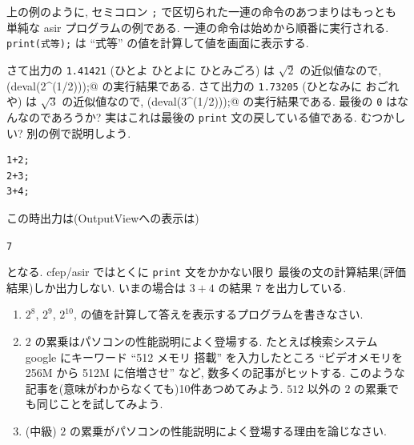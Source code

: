 \documentclass{jbook}
\begin{document}
上の例のように,
セミコロン {\tt ;} で区切られた一連の命令のあつまりはもっとも
単純な asir プログラムの例である.  
一連の命令は始めから順番に実行される.
{\tt print(式等);} は ``式等'' の値を計算して値を画面に表示する.

さて出力の {\tt 1.41421} (ひとよ ひとよに ひとみごろ) は $\sqrt{2}$ の近似値なので,
\verb@print(deval(2^(1/2)));@
の実行結果である. 
さて出力の {\tt 1.73205} (ひとなみに おごれや) は $\sqrt{3}$ の近似値なので,
\verb@print(deval(3^(1/2)));@
の実行結果である. 
最後の {\tt 0} はなんなのであろうか?
実はこれは最後の {\tt print} 文の戻している値である.
むつかしい? 別の例で説明しよう.

\noindent
{}
\begin{screen}
\begin{verbatim}
1+2;
2+3;
3+4;
\end{verbatim}
\end{screen}
この時出力は(OutputViewへの表示は)
\begin{screen}
{\tt 7}
\end{screen}
となる.
cfep/asir ではとくに {\tt print} 文をかかない限り
最後の文の計算結果(評価結果)しか出力しない.
いまの場合は $3+4$  の結果 $7$ を出力している.

\begin{problem} \rm
\begin{enumerate}  
\item $2^8$, $2^9$, $2^{10}$, 
の値を計算して答えを表示するプログラムを書きなさい.
\item $2$ の累乗はパソコンの性能説明によく登場する.
たとえば検索システム google にキーワード ``512 メモリ 搭載'' を入力したところ
``ビデオメモリを 256M から 512M に倍増させ'' など, 数多くの記事がヒットする.
このような記事を(意味がわからなくても)10件あつめてみよう.
$512$ 以外の $2$ の累乗でも同じことを試してみよう.
\item (中級) $2$ の累乗がパソコンの性能説明によく登場する理由を論じなさい.
\end{enumerate}
\end{problem}

\bigbreak
\end{document}
